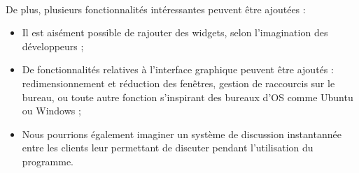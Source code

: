 \paragraph{}
De plus, plusieurs fonctionnalités intéressantes peuvent être ajoutées :
\begin{itemize}
	\item Il est aisément possible de rajouter des widgets, selon l'imagination des développeurs ;
	\item De fonctionnalités relatives à l'interface graphique peuvent être ajoutés : redimensionnement et réduction des fenêtres, gestion de raccourcis sur le bureau, ou toute autre fonction s'inspirant des bureaux d'OS comme Ubuntu ou Windows ;
	\item Nous pourrions également imaginer un système de discussion instantannée entre les clients leur permettant de discuter pendant l'utilisation du programme.
\end{itemize}


